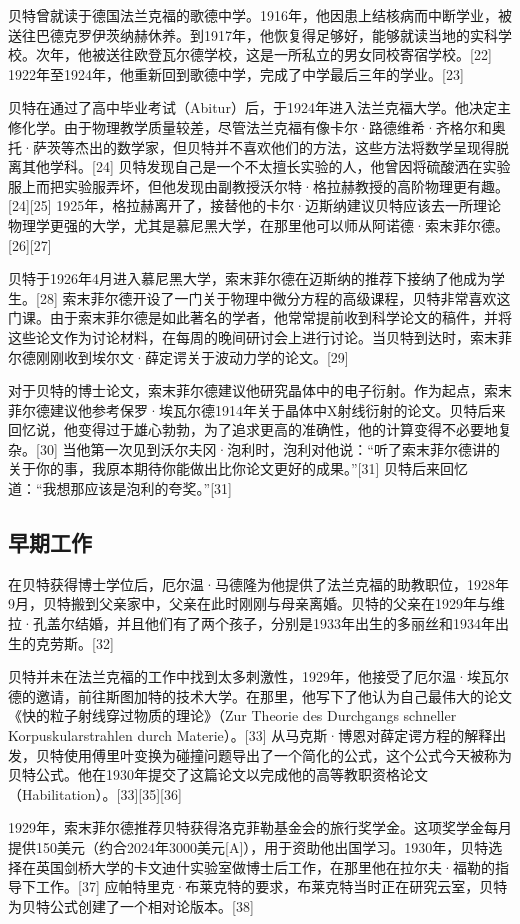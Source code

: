 贝特曾就读于德国法兰克福的歌德中学。1916年，他因患上结核病而中断学业，被送往巴德克罗伊茨纳赫休养。到1917年，他恢复得足够好，能够就读当地的实科学校。次年，他被送往欧登瓦尔德学校，这是一所私立的男女同校寄宿学校。[22] 1922年至1924年，他重新回到歌德中学，完成了中学最后三年的学业。[23]

贝特在通过了高中毕业考试（Abitur）后，于1924年进入法兰克福大学。他决定主修化学。由于物理教学质量较差，尽管法兰克福有像卡尔·路德维希·齐格尔和奥托·萨茨等杰出的数学家，但贝特并不喜欢他们的方法，这些方法将数学呈现得脱离其他学科。[24] 贝特发现自己是一个不太擅长实验的人，他曾因将硫酸洒在实验服上而把实验服弄坏，但他发现由副教授沃尔特·格拉赫教授的高阶物理更有趣。[24][25] 1925年，格拉赫离开了，接替他的卡尔·迈斯纳建议贝特应该去一所理论物理学更强的大学，尤其是慕尼黑大学，在那里他可以师从阿诺德·索末菲尔德。[26][27]

贝特于1926年4月进入慕尼黑大学，索末菲尔德在迈斯纳的推荐下接纳了他成为学生。[28] 索末菲尔德开设了一门关于物理中微分方程的高级课程，贝特非常喜欢这门课。由于索末菲尔德是如此著名的学者，他常常提前收到科学论文的稿件，并将这些论文作为讨论材料，在每周的晚间研讨会上进行讨论。当贝特到达时，索末菲尔德刚刚收到埃尔文·薛定谔关于波动力学的论文。[29]

对于贝特的博士论文，索末菲尔德建议他研究晶体中的电子衍射。作为起点，索末菲尔德建议他参考保罗·埃瓦尔德1914年关于晶体中X射线衍射的论文。贝特后来回忆说，他变得过于雄心勃勃，为了追求更高的准确性，他的计算变得不必要地复杂。[30] 当他第一次见到沃尔夫冈·泡利时，泡利对他说：“听了索末菲尔德讲的关于你的事，我原本期待你能做出比你论文更好的成果。”[31] 贝特后来回忆道：“我想那应该是泡利的夸奖。”[31]
\subsection{早期工作}  
在贝特获得博士学位后，厄尔温·马德隆为他提供了法兰克福的助教职位，1928年9月，贝特搬到父亲家中，父亲在此时刚刚与母亲离婚。贝特的父亲在1929年与维拉·孔盖尔结婚，并且他们有了两个孩子，分别是1933年出生的多丽丝和1934年出生的克劳斯。[32]

贝特并未在法兰克福的工作中找到太多刺激性，1929年，他接受了厄尔温·埃瓦尔德的邀请，前往斯图加特的技术大学。在那里，他写下了他认为自己最伟大的论文《快的粒子射线穿过物质的理论》（Zur Theorie des Durchgangs schneller Korpuskularstrahlen durch Materie）。[33] 从马克斯·博恩对薛定谔方程的解释出发，贝特使用傅里叶变换为碰撞问题导出了一个简化的公式，这个公式今天被称为贝特公式。他在1930年提交了这篇论文以完成他的高等教职资格论文（Habilitation）。[33][35][36]

1929年，索末菲尔德推荐贝特获得洛克菲勒基金会的旅行奖学金。这项奖学金每月提供150美元（约合2024年3000美元[A]），用于资助他出国学习。1930年，贝特选择在英国剑桥大学的卡文迪什实验室做博士后工作，在那里他在拉尔夫·福勒的指导下工作。[37] 应帕特里克·布莱克特的要求，布莱克特当时正在研究云室，贝特为贝特公式创建了一个相对论版本。[38]

